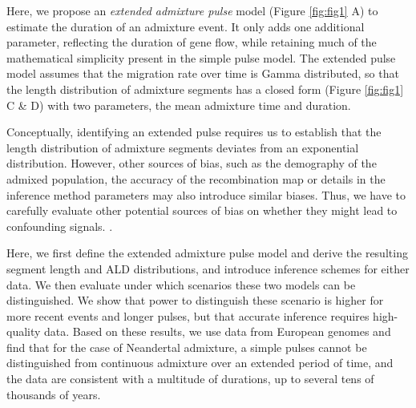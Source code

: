 \documentclass[11pt]{article}
\begin{document}
Here, we propose an \emph{extended admixture pulse} model (Figure \ref{fig:fig1} A) to estimate the duration of an admixture event. It only adds one additional parameter, reflecting the duration of gene flow, while retaining much of the mathematical simplicity present in the simple pulse model. 
The extended pulse model assumes that the migration rate over time is Gamma distributed, so that the length distribution of admixture segments has a closed form (Figure \ref{fig:fig1} C \& D) with two parameters, the mean admixture time and duration.

Conceptually, identifying an extended pulse requires us to establish that the length distribution of admixture segments deviates from an exponential distribution. However, other sources of bias, such as the demography of the admixed population, the accuracy of the recombination map or details in the inference method parameters may also introduce similar biases. Thus, we have to carefully evaluate other potential sources of bias on whether they might lead to confounding signals. \citep{sankararaman_date_2012,fu_genome_2014,moorjani_genetic_2016}. 


Here, we first define the extended admixture pulse model and derive the resulting segment length and ALD distributions, and introduce inference schemes for either data. We then evaluate under which scenarios these two models can be distinguished.  We show that power to distinguish these scenario is higher for more recent events and longer pulses, but that accurate inference requires high-quality data. Based on these results, we use data from European genomes  \citep{the_1000_genomes_project_consortium_global_2015} and find that for the case of Neandertal admixture, a simple pulses cannot be distinguished from continuous admixture over an extended period of time, and the data are consistent with a multitude of durations, up to several tens of thousands of years. 
\end{document}
